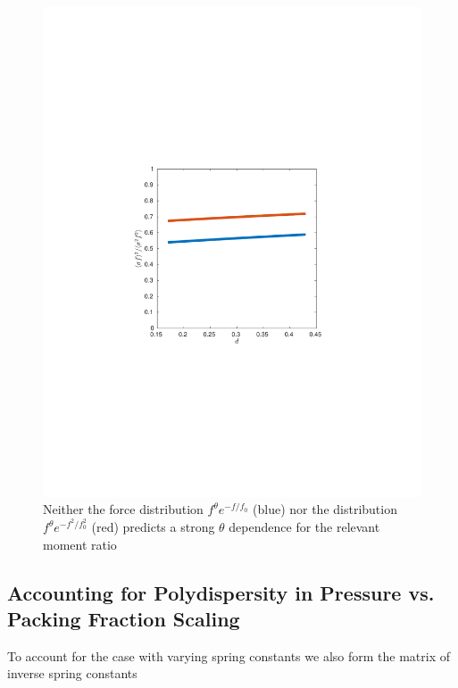 \begin{figure}[h!]
    \includegraphics[width=\columnwidth, trim=143 240 163 250, clip]{excessContactsScaling/theoryMFR.pdf}
    \caption{Neither the force distribution $f^\theta e^{-f/f_0}$  (blue) nor the distribution $f^\theta e^{-f^2/f_0^2}$  (red) predicts a strong $\theta$ dependence for the relevant moment ratio}
    \label{plot:theory_mfr}
\end{figure}




\subsection{Accounting for Polydispersity in Pressure vs. Packing Fraction Scaling}

To account for the case with varying spring constants we also form the matrix of inverse spring constants

